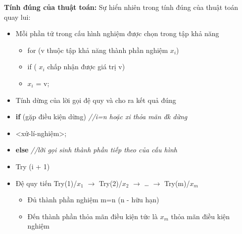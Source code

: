 \textbf{Tính đúng của thuật toán:}
Sự hiển nhiên trong tính đúng của thuật toán quay lui:
\begin{itemize}
    \item Mỗi phần tử trong cấu hình nghiệm được chọn trong tập khả năng
        \begin{itemize}
            \item [] for (v thuộc tập khả năng thành phần nghiệm $x_i$)
            \item [] \hspace{1cm} if ( $x_i$ chấp nhận được giá trị v)
            \item [] \hspace{1.5cm} $x_i$ = v;
        \end{itemize}
        
    \item Tính dừng của lời gọi đệ quy và cho ra kết quả đúng
    \item [] \hspace{1.8cm} \textbf{if} (gặp điều kiện dừng) \textit{//i=n hoặc xi thỏa mãn đk dừng}
    \item [] \hspace{2.5cm} <xử-lí-nghiệm>;
    \item [] \hspace{1.8cm} \textbf{else} \textit{//lời gọi sinh thành phần tiếp theo của cấu hình}
    \item [] \hspace{2.5cm} Try (i + 1)
    
    \item \hspace{0.5cm} Đệ quy tiến Try(1)/$x_1$ $\rightarrow$ Try(2)/$x_2$ $\rightarrow$ … $\rightarrow$ Try(m)/$x_m$ 
        \begin{itemize}
            \item Đủ thành phần nghiệm m=n (n - hữu hạn)
            \item Đến thành phần thỏa mãn điều kiện tức là $x_m$ thỏa mãn điều kiện nghiệm
        \end{itemize}
\end{itemize}


